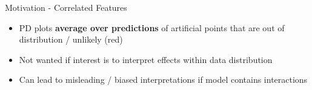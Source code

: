 \documentclass[11pt,compress,t,notes=noshow, aspectratio=169, xcolor=table]{beamer}
\begin{document}
\begin{frame}{Motivation - Correlated Features}
\begin{itemize}
    \item PD plots \textbf{average over predictions} of artificial points that are out of distribution / unlikely (red)
    \item Not wanted if interest is to interpret effects within data distribution
    \item Can lead to misleading / biased interpretations if model contains interactions
\end{itemize}



\end{frame}
\end{document}
